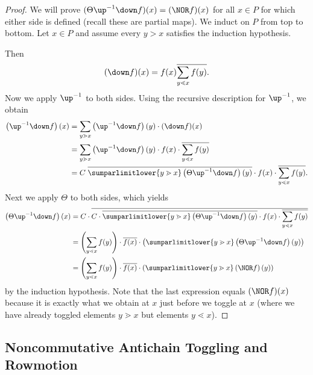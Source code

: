 \begin{proof}
We will prove $(\Theta\up^{-1}\down f)(x)=(\NOR f)(x)$
for all $x\in P$ for which either side is defined (recall these are partial maps). We induct on $P$ from top to bottom.
Let $x\in P$ and assume
every $y>x$ satisfies the induction hypothesis.

Then 
\[
(\down f)(x) = f(x)
 \overline{\sum\limits_{y\lessdot x}f(y)}.
\]
Now we apply $\up^{-1}$ to both sides. Using the recursive
description for $\up^{-1}$, we obtain
\begin{align*}
 \left(\up^{-1}\down f\right)(x) &=
 \sum\limits_{y\gtrdot x}\left(\up^{-1}\down f\right)(y)\cdot (\down f)(x)\\
 &= \sum\limits_{y\gtrdot x}\left(\up^{-1}\down f\right)(y) \cdot f(x) \cdot \overline{\sum\limits_{y\lessdot x}f(y)}\\
 &= C\; \overline{\sumparlimitlower{y\gtrdot x} \left(\Theta \up^{-1}\down f\right)(y)} \cdot f(x) \cdot \overline{\sum\limits_{y\lessdot x}f(y)}.
\end{align*}
Next we apply $\Theta$ to both sides, which yields
\begin{align*}
 \left(\Theta \up^{-1}\down f\right)(x) &=
 C\cdot \overline{
 C\cdot \overline{\sumparlimitlower{y\gtrdot x}\left(\Theta \up^{-1}\down f\right)(y)} \cdot f(x) \cdot \overline{\sum\limits_{y\lessdot x}f(y)}}\\
 &=
 \left(\sum\limits_{y\lessdot x}f(y)\right) \cdot
 \overline{f(x)} \cdot \left( \sumparlimitlower{y\gtrdot x}\left(\Theta \up^{-1}\down f\right)(y) \right)\\
 &=
 \left(\sum\limits_{y\lessdot x}f(y)\right) \cdot
 \overline{f(x)} \cdot \left( \sumparlimitlower{y\gtrdot x}\left(\NOR f\right)(y) \right)
\end{align*}
by the induction hypothesis.
Note that the last expression equals $(\NOR f)(x)$
because it is exactly what we obtain
at $x$ just before we toggle at $x$ (where we have already toggled elements $y\gtrdot x$ but  elements $y\lessdot x$).
\end{proof}

\subsection{Noncommutative Antichain Toggling and Rowmotion}

